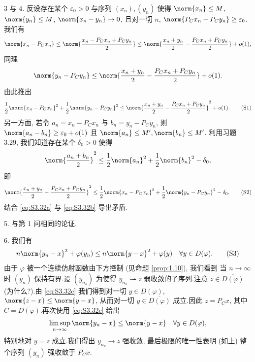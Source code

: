 3 与 4. 反设存在某个 $\varepsilon_0>0$ 与序列 $(x_n),(y_n)$ 使得
$\norm{x_n}\le M$, $\norm{y_n}\le M$, $\norm{x_n-y_n}\to0$, 且对一切 $n$,
$\norm{P_Cx_n-P_Cy_n}\ge\varepsilon_0$.我们有
\begin{equation*}
\norm{x_n-P_Cx_n}\le\norm{\frac{x_n-P_Cx_n+P_Cy_n}{2}}\le\norm{\frac{x_n+y_n}{2}-\frac{P_Cx_n+P_Cy_n}{2}}+o(1),
\end{equation*}
同理
\begin{equation*}
\norm{y_n-P_Cy_n}\le\norm{\frac{x_n+y_n}{2}-\frac{P_Cx_n+P_Cy_n}{2}}+o(1).
\end{equation*}
由此推出
\begin{equation}
\frac12\norm{x_n-P_Cx_n}^2+\frac12\norm{y_n-P_Cy_n}^2\le\norm{\frac{x_n+y_n}{2}-\frac{P_Cx_n+P_Cy_n}{2}}^2+o(1).
\tag{S1}
\label{eq:S3.32a}
\end{equation}
另一方面, 若令 $a_n=x_n-P_Cx_n$ 与 $b_n=y_n-P_Cy_n$, 则
$\norm{a_n-b_n}\ge\varepsilon_0+o(1)$ 且 $\norm{a_n}\le M', \norm{b_n}\le M'$.
利用习题 3.29, 我们知道存在某个 $\delta_0>0$ 使得
\begin{equation*}
\norm{\frac{a_n+b_n}{2}}^2\le\frac12\norm{a_n}^2+\frac12\norm{b_n}^2-\delta_0,
\end{equation*}
即
\begin{equation}
\norm{\frac{x_n+y_n}{2}-\frac{P_Cx_n+P_Cy_n}{2}}^2\le\frac12\norm{x_n-P_Cx_n}^2+\frac12\norm{y_n-P_Cy_n}^2-\delta_0.
\tag{S2}
\label{eq:S3.32b}
\end{equation}
结合 \eqref{eq:S3.32a} 与 \eqref{eq:S3.32b} 导出矛盾.

5. 与第 1 问相同的论证.

6. 我们有
\begin{equation}
n\norm{y_n-x}^2+\varphi(y_n)\le n\norm{y-x}^2+\varphi(y)\quad\forall y\in D(\varphi).
\tag{S3}
\label{eq:S3.32c}
\end{equation}
由于 $\varphi$ 被一个连续仿射函数由下方控制 (见命题  \ref{prop:1.10}), 我们看到
当 $n\to\infty$ 时 $(y_n)$ 保持有界.设 $(y_{n_k})$ 为使得
$y_{n_k}\rightharpoonup z$ 弱收敛的子序列.注意 $z\in\overline{D(\varphi)}$
(为什么?).由 \eqref{eq:S3.32c} 我们得到对一切 $y\in D(\varphi)$,
$\norm{z-x}\le\norm{y-x}$, 从而对一切 $y\in\overline{D(\varphi)}$ 成立.因此
$z=P_Cx$, 其中 $C=\overline{D(\varphi)}$.再次使用 \eqref{eq:S3.32c} 给出
\begin{equation*}
\limsup_{n\to\infty}\norm{y_n-x}\le\norm{y-x}\quad\forall y\in D(\varphi),
\end{equation*}
特别地对 $y=z$ 成立.我们得出 $y_{n_k}\to z$ 强收敛, 最后极限的唯一性表明
(如上) 整个序列 $(y_n)$ 强收敛于 $P_Cx$.

